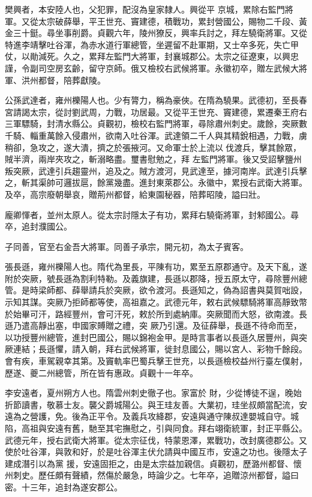 \begin{pinyinscope}
 樊興者，本安陸人也，父犯罪，配沒為皇家隸人。興從平
 京城，累除右監門將軍。又從太宗破薛舉，平王世充、竇建德，積戰功，累封營國公，賜物二千段、黃金三十鋌。尋坐事削爵。貞觀六年，陵州獠反，興率兵討之，拜左驍衛將軍。又從特進李靖擊吐谷渾，為赤水道行軍總管，坐遲留不赴軍期，又士卒多死，失亡甲仗，以勛減死。久之，累拜左監門大將軍，封襄城郡公。太宗之征遼東，以興忠謹，令副司空房玄齡，留守京師。俄又檢校右武候將軍。永徽初卒，贈左武候大將軍、洪州都督，陪葬獻陵。



 公孫武達者，雍州櫟陽人也。少有膂力，稱為豪俠。在隋為驍果。武德初，至長春宮請謁太宗，從討劉武周，力戰，功居最。又從平王世充、竇建德，累遷秦王府右三軍驃騎，封清水縣公。貞觀初，檢校右監門將軍，尋除肅州刺史。歲餘，突厥數千騎、輜重萬餘入侵肅州，欲南入吐谷渾。武達領二千人與其精銳相遇，力戰，虜稍卻，急攻之，遂大潰，擠之於張掖河。又命軍士於上流以伐渡兵，擊其餘眾，賊半濟，兩岸夾攻之，斬溺略盡。璽書慰勉之，拜
 左監門將軍。後又受詔擊鹽州叛突厥，武達引兵趨靈州，追及之。賊方渡河，見武達至，據河南岸。武達引兵擊之，斬其渠帥可邏拔扈，餘黨幾盡。進封東萊郡公。永徽中，累授右武衛大將軍。及卒，高宗廢朝舉哀，贈荊州都督，給東園秘器，陪葬昭陵，謚曰壯。



 龐卿惲者，並州太原人。從太宗討隱太子有功，累拜右驍衛將軍，封邾國公。尋卒，追封濮國公。



 子同善，官至右金吾大將軍。同善子承宗，開元初，為太子賓客。



 張長遜，雍州櫟陽人也。隋代為里長，平陳有功，累至五原郡通守。及天下亂，遂附於突厥，號長遜為割利特勒。及義旗建，長遜以郡降，授五原太守，尋除豐州總管。是時梁師都、薛舉請兵於突厥，欲令渡河。長遜知之，偽為詔書與莫賀咄設，示知其謀。突厥乃拒師都等使，高祖嘉之。武德元年，敕右武候驃騎將軍高靜致幣於始畢可汗，路經豐州，會可汗死，敕於所到處納庫。突厥聞而大怒，欲南渡。長遜乃遣高靜出塞，申國家賻贈之禮，突
 厥乃引還。及征薛舉，長遜不待命而至，以功授豐州總管，進封巴國公，賜以錦袍金甲。是時言事者以長遜久居豐州，與突厥連結；長遜懼，請入朝，拜右武候將軍，徙封息國公，賜以宮人、彩物千餘段。會有疾，車駕親幸其第。及竇軌率巴蜀兵擊王世充，以長遜檢校益州行臺左僕射，歷遂、夔二州總管，所在皆有惠政。貞觀十一年卒。



 李安遠者，夏州朔方人也。隋雲州刺史徹子也。家富於
 財，少從博徒不逞，晚始折節讀書，敬慕士友。襲父爵城陽公。與王珪友善。大業初，珪坐叔頗當配流，安遠為之營護，免。後為正平令。及義兵攻絳郡，安遠與通守陳叔達嬰城自守。城陷，高祖與安遠有舊，馳至其宅撫慰之，引與同食。拜右翊衛統軍，封正平縣公。武德元年，授右武衛大將軍。從太宗征伐，特蒙恩澤，累戰功，改封廣德郡公。又使於吐谷渾，與敦和好，於是吐谷渾主伏允請與中國互市，安遠之功也。後隱太子建成潛引以為黨
 援，安遠固拒之，由是太宗益加親信。貞觀初，歷潞州都督、懷州刺史。歷任頗有聲績，然傷於嚴急，時論少之。七年卒，追贈涼州都督，謚曰密。十三年，追封為遂安郡公。




\end{pinyinscope}
